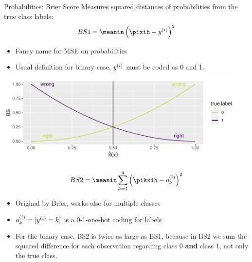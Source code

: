\documentclass[11pt,compress,t,notes=noshow, xcolor=table]{beamer}
\newenvironment{knitrout}{}{} %
\begin{document}
\begin{vbframe}{Probabilities: Brier Score}
Measures squared distances of probabilities from the true class labels:
\[
BS1 = \meanin \left( \pixih - \yi \right)^2
\]


\begin{itemize}
  \item Fancy name for MSE on probabilities
  \item Usual definition for binary case, $y^{(i)}$ must be coded as 0 and 1.
\end{itemize}

\begin{knitrout}\scriptsize
{}\color{fgcolor}

{\centering \includegraphics[width=0.95\textwidth]{figure/eval_mclass_1} 

}



\end{knitrout}


\framebreak

\[
BS2 = \meanin \sumkg \left( \pikxih - o_k^{(i)} \right)^2
\]
\begin{itemize}
  \item Original by Brier, works also for multiple classes
  \item $ o_k^{(i)} = [ y^{(i)} = k ] $ is a 0-1-one-hot coding for labels
  \item For the binary case, BS2 is twice as large as BS1, because in BS2 we sum the squared
    difference for each observation regarding class 0 \textbf{and} class 1, not only the true class.
\end{itemize}


\end{vbframe}
\end{document}
